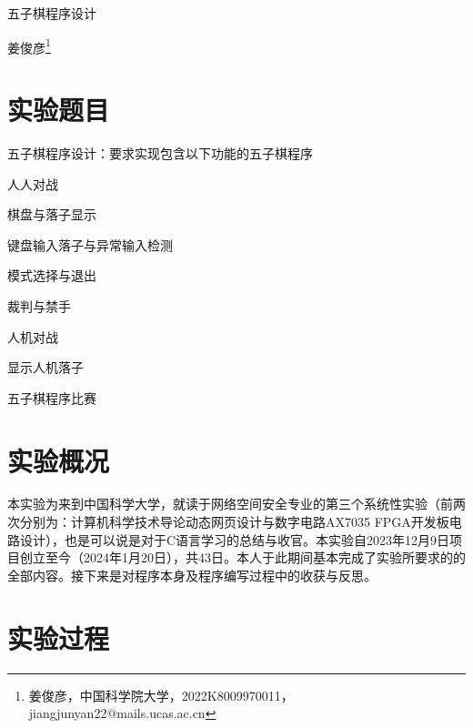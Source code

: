 \def\allfiles{}


	\setlength{\baselineskip}{22pt}
	 \pagestyle{fancy}
	\begin{center}
		\Huge 五子棋程序设计\\
		\Large 
	\end{center}
	\begin{center}
		\large \kaishu 姜俊彦\footnote{姜俊彦，中国科学院大学，2022K8009970011，jiangjunyan22@mails.ucas.ac.cn}
	\end{center}
	\begin{spacing}{1.5}
		\tableofcontents
	\end{spacing}
	\setcounter{page}{1}
	\thispagestyle{fancy}
	\newpage
	\section{实验题目}
	\large\kaishu  五子棋程序设计：要求实现包含以下功能的五子棋程序
	
	\begin{compactitem}
		\item 人人对战
		\begin{compactitem}
			\item 棋盘与落子显示
			\item 键盘输入落子与异常输入检测
			\item 模式选择与退出
			\item 裁判与禁手
		\end{compactitem}
		\item 人机对战
		\begin{compactitem}
			\item 显示人机落子
			\item 五子棋程序比赛
		\end{compactitem}
	\end{compactitem}
	\section{实验概况}
	本实验为来到中国科学大学，就读于网络空间安全专业的第三个系统性实验（前两次分别为：计算机科学技术导论动态网页设计与数字电路AX7035 FPGA开发板电路设计），也是可以说是对于C语言学习的总结与收官。本实验自2023年12月9日项目创立至今（2024年1月20日），共43日。本人于此期间基本完成了实验所要求的的全部内容。接下来是对程序本身及程序编写过程中的收获与反思。
	\section{实验过程}
	\songti
